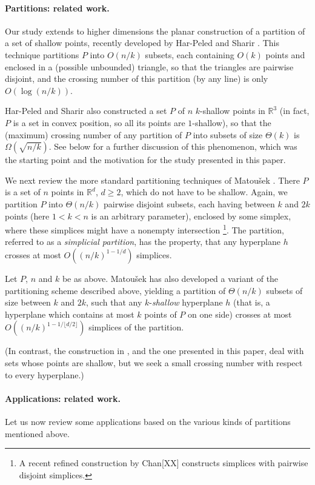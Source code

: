 \documentclass[11pt]{article}
\def\reals{\mathbb R}
\begin{document}
\paragraph{Partitions: related work.} Our study extends to higher dimensions the planar construction of a partition of a set of shallow points, recently
developed by Har-Peled and Sharir \cite{hs11}. This technique partitions $P$ into $O(n/k)$ subsets, each containing $O(k)$ points and enclosed in a
(possible unbounded) triangle, so that the triangles are pairwise disjoint, and the crossing number of this partition (by any line) is only $O(\log(n/k))$.

Har-Peled and Sharir also constructed a set $P$ of $n$ $k$-shallow points in $\reals^{3}$ (in fact, $P$ is a set in convex position, so all its points are
$1$-shallow), so that the (maximum) crossing number of any partition of $P$ into subsets of size $\Theta(k)$ is $\Omega(\sqrt{n/k})$. See below for a
further discussion of this phenomenon, which was the starting point and the motivation for the study presented in this paper.

We next review the more standard partitioning techniques of Matou\v{s}ek \cite{mat92a,mat92b}. There $P$ is a set of $n$ points in $\reals^{d}$, $d \geq 2$,
which do not have to be shallow. Again, we partition $P$ into $\Theta(n/k)$ pairwise disjoint subsets, each having between $k$ and $2k$ points (here $1 < k
< n$ is an arbitrary parameter), enclosed by some simplex, where these simplices might have a nonempty intersection \footnote{A recent refined construction
by Chan[XX] constructs simplices with pairwise disjoint simplices.}. The partition, referred to as a \emph{simplicial partition}, has the property, that any
hyperplane $h$ crosses at most $O((n/k)^{1-1/d})$ simplices.

Let $P$, $n$ and $k$ be as above. Matou\v{s}ek \cite{mat92b} has also developed a variant of the partitioning scheme described above, yielding a partition
of $\Theta(n/k)$ subsets of size between $k$ and $2k$, such that any $k$-{\em shallow} hyperplane $h$ (that is, a hyperplane which contains at most $k$
points of $P$ on one side) crosses at most $O((n/k)^{1-1/\lfloor d/2 \rfloor})$ simplices of the partition.

(In contrast, the construction in \cite{hs11}, and the one presented in this paper, deal with sets whose points are shallow, but we seek a small crossing
number with respect to every hyperplane.)


\paragraph{Applications: related work.} Let us now review some applications based on the various kinds of partitions mentioned above.
\end{document}
